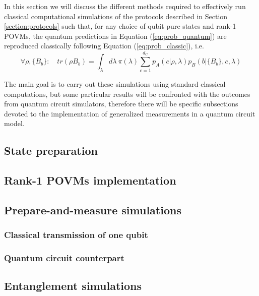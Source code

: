 In this section we will discuss the different methods required to effectively run classical computational simulations of the protocols described in Section \ref{section:protocols} such that, for any choice of qubit pure states and rank-1 POVMs, the quantum predictions in Equation (\ref{eq:prob_quantum}) are reproduced classically following Equation (\ref{eq:prob_classic}), i.e.
\begin{equation}
\forall \rho, \{B_b\}:\quad tr(\rho B_b) = \int_{\lambda} d\lambda\ \pi(\lambda) \sum_{c=1}^{d_C} p_A(c|\rho, \lambda) p_B(b|\{B_b\}, c, \lambda)    
\end{equation}

The main goal is to carry out these simulations using standard classical computations, but some particular results will be confronted with the outcomes from quantum circuit simulators, therefore there will be specific subsections devoted to the implementation of generalized measurements in a quantum circuit model. 
\subsection{State preparation}

\subsection{Rank-1 POVMs implementation}

\subsection{Prepare-and-measure simulations}
\subsubsection{Classical transmission of one qubit}

\subsubsection{Quantum circuit counterpart}

\subsection{Entanglement simulations}
